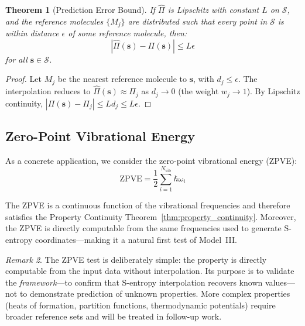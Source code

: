 \documentclass[11pt,twocolumn,a4paper]{article}
\newtheorem{theorem}{Theorem}[section]
\theoremstyle{definition}
\theoremstyle{remark}
\newtheorem{remark}[theorem]{Remark}
\newcommand{\Sspace}{\mathcal{S}}
\newcommand{\Nvib}{N_{\mathrm{vib}}}
\begin{document}
\begin{theorem}[Prediction Error Bound]
\label{thm:prediction_error}
If $\hat{\Pi}$ is Lipschitz with constant $L$ on $\Sspace$, and the reference molecules $\{M_j\}$ are distributed such that every point in $\Sspace$ is within distance $\epsilon$ of some reference molecule, then:
\begin{equation}
|\hat{\Pi}(\mathbf{s}) - \Pi(\mathbf{s})| \leq L \epsilon
\label{eq:error_bound}
\end{equation}
for all $\mathbf{s} \in \Sspace$.
\end{theorem}

\begin{proof}
Let $M_j$ be the nearest reference molecule to $\mathbf{s}$, with $d_j \leq \epsilon$. The interpolation reduces to $\hat{\Pi}(\mathbf{s}) \approx \Pi_j$ as $d_j \to 0$ (the weight $w_j \to 1$). By Lipschitz continuity, $|\Pi(\mathbf{s}) - \Pi_j| \leq L d_j \leq L\epsilon$.
\end{proof}

\subsection{Zero-Point Vibrational Energy}

As a concrete application, we consider the zero-point vibrational energy (ZPVE):
\begin{equation}
\text{ZPVE} = \frac{1}{2} \sum_{i=1}^{\Nvib} \hbar \omega_i
\label{eq:zpve}
\end{equation}

The ZPVE is a continuous function of the vibrational frequencies and therefore satisfies the Property Continuity Theorem~\ref{thm:property_continuity}. Moreover, the ZPVE is directly computable from the same frequencies used to generate S-entropy coordinates---making it a natural first test of Model~III.

\begin{remark}
The ZPVE test is deliberately simple: the property is directly computable from the input data without interpolation. Its purpose is to validate the \emph{framework}---to confirm that S-entropy interpolation recovers known values---not to demonstrate prediction of unknown properties. More complex properties (heats of formation, partition functions, thermodynamic potentials) require broader reference sets and will be treated in follow-up work.
\end{remark}


\end{document}
